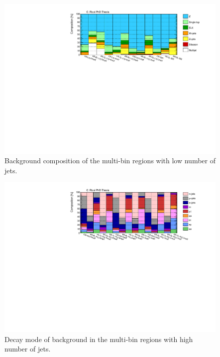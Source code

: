 \begin{figure}[htbp]
\includegraphics[width=\textwidth]{figures/strong_prod/comp_plots/Lnj_bkg.pdf}
\caption{Background composition of the multi-bin regions with low number of jets.}
	\label{fig:bkgcomp_Lnj}
\end{figure}



\begin{figure}[htbp]
\includegraphics[width=\textwidth]{figures/strong_prod/comp_plots/Hnj_tt.pdf}
\caption{Decay mode of \ttbar background in the multi-bin regions with high number of jets.}
	\label{fig:ttcomp_Hnj}
\end{figure}

